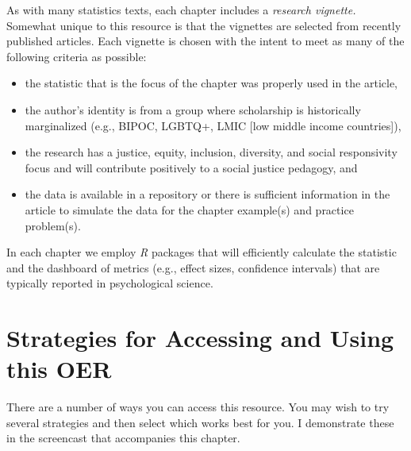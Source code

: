 \documentclass[
]{book}
\providecommand{\tightlist}{%
  \setlength{\itemsep}{0pt}\setlength{\parskip}{0pt}}
\begin{document}
As with many statistics texts, each chapter includes a \emph{research vignette.} Somewhat unique to this resource is that the vignettes are selected from recently published articles. Each vignette is chosen with the intent to meet as many of the following criteria as possible:

\begin{itemize}
\tightlist
\item
  the statistic that is the focus of the chapter was properly used in the article,
\item
  the author's identity is from a group where scholarship is historically marginalized (e.g., BIPOC, LGBTQ+, LMIC {[}low middle income countries{]}),
\item
  the research has a justice, equity, inclusion, diversity, and social responsivity focus and will contribute positively to a social justice pedagogy, and
\item
  the data is available in a repository or there is sufficient information in the article to simulate the data for the chapter example(s) and practice problem(s).
\end{itemize}

In each chapter we employ \emph{R} packages that will efficiently calculate the statistic and the dashboard of metrics (e.g., effect sizes, confidence intervals) that are typically reported in psychological science.

\hypertarget{strategies-for-accessing-and-using-this-oer}{%
\section{Strategies for Accessing and Using this OER}\label{strategies-for-accessing-and-using-this-oer}}

There are a number of ways you can access this resource. You may wish to try several strategies and then select which works best for you. I demonstrate these in the screencast that accompanies this chapter.
\end{document}
